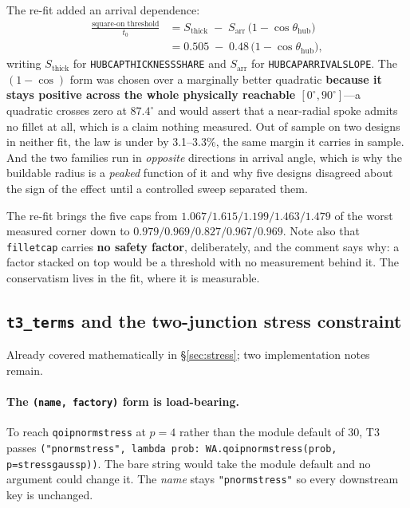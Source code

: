 \documentclass[11pt,a4paper]{article}
\DeclareRobustCommand{\code}[1]{%
  \texttt{\small\def\_{\textunderscore\discretionary{}{}{}}#1}}
\begin{document}
The re-fit added an arrival dependence:
%
\begin{align}
  \frac{\text{square-on threshold}}{t_0}
    &= S_{\text{thick}} \;-\; S_{\text{arr}}\,\bigl(1 - \cos\theta_{\text{hub}}\bigr)
     \nonumber\\
    &= 0.505 \;-\; 0.48\,\bigl(1 - \cos\theta_{\text{hub}}\bigr),
  \label{eq:hubcap}
\end{align}
%
writing $S_{\text{thick}}$ for \code{HUB\_CAP\_THICKNESS\_SHARE} and $S_{\text{arr}}$
for \code{HUB\_CAP\_ARRIVAL\_SLOPE}.
%
The $(1 - \cos)$ form was chosen over a marginally better quadratic \textbf{because it
stays positive across the whole physically reachable $[0^\circ, 90^\circ]$}---a
quadratic crosses zero at $87.4^\circ$ and would assert that a near-radial spoke admits
no fillet at all, which is a claim nothing measured. Out of sample on two designs in
neither fit, the law is under by 3.1--3.3\%, the same margin it carries in sample. And
the two families run in \emph{opposite} directions in arrival angle, which is why the
buildable radius is a \emph{peaked} function of it and why five designs disagreed about
the sign of the effect until a controlled sweep separated them.

The re-fit brings the five caps from $1.067 / 1.615 / 1.199 / 1.463 / 1.479$ of the
worst measured corner down to $0.979 / 0.969 / 0.827 / 0.967 / 0.969$. Note also that
\code{fillet\_cap} carries \textbf{no safety factor}, deliberately, and the comment says
why: a factor stacked on top would be a threshold with no measurement behind it. The
conservatism lives in the fit, where it is measurable.

\subsection{\texttt{t3\_terms} and the two-junction stress constraint}
\label{sec:t3}

Already covered mathematically in \S\ref{sec:stress}; two implementation notes remain.

\paragraph{The \code{(name, factory)} form is load-bearing.}
To reach \code{\_qoi\_pnorm\_stress} at $p = 4$ rather than the module default of 30, T3
passes \code{("pnorm\_stress", lambda prob: WA.\_qoi\_pnorm\_stress(prob, p=stress\_gauss\_p))}.
The bare string would take the module default and no argument could change it. The
\emph{name} stays \code{"pnorm\_stress"} so every downstream key is unchanged.
\end{document}
